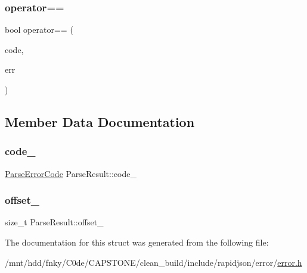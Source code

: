 \subsubsection{\texorpdfstring{operator==}{operator==}}
{\footnotesize\ttfamily bool operator== (\begin{DoxyParamCaption}\item[{\hyperlink{group__RAPIDJSON__ERRORS_ga8d4b32dfc45840bca189ade2bbcb6ba7}{Parse\+Error\+Code}}]{code,  }\item[{const \hyperlink{structParseResult}{Parse\+Result} \&}]{err }\end{DoxyParamCaption})\hspace{0.3cm}{\ttfamily [friend]}}



\subsection{Member Data Documentation}
\mbox{\label{structParseResult_aa30a53c4b7452efb82baf4767cda33fb}} 
\subsubsection{\texorpdfstring{code\+\_\+}{code\_}}
{\footnotesize\ttfamily \hyperlink{group__RAPIDJSON__ERRORS_ga8d4b32dfc45840bca189ade2bbcb6ba7}{Parse\+Error\+Code} Parse\+Result\+::code\+\_\+\hspace{0.3cm}{\ttfamily [private]}}

\mbox{\label{structParseResult_a4854b4b3210fd1bbc0f1457aa0d2b65a}} 
\subsubsection{\texorpdfstring{offset\+\_\+}{offset\_}}
{\footnotesize\ttfamily size\+\_\+t Parse\+Result\+::offset\+\_\+\hspace{0.3cm}{\ttfamily [private]}}



The documentation for this struct was generated from the following file\+:\begin{DoxyCompactItemize}
\item 
/mnt/hdd/fnky/\+C0de/\+C\+A\+P\+S\+T\+O\+N\+E/clean\+\_\+build/include/rapidjson/error/\hyperlink{error_8h}{error.\+h}\end{DoxyCompactItemize}
